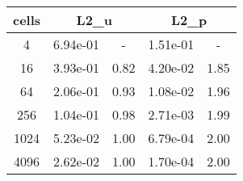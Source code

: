\documentclass[10pt]{report}
\begin{document}
\begin{table}[H]
\begin{center}
\begin{tabular}{|c|c|c|c|c|} \hline
cells & 
\multicolumn{2}{|c|}{L2_u} & 
\multicolumn{2}{|c|}{L2_p}\\ \hline
4 & 6.94e-01 & - & 1.51e-01 & -\\ \hline
16 & 3.93e-01 & 0.82 & 4.20e-02 & 1.85\\ \hline
64 & 2.06e-01 & 0.93 & 1.08e-02 & 1.96\\ \hline
256 & 1.04e-01 & 0.98 & 2.71e-03 & 1.99\\ \hline
1024 & 5.23e-02 & 1.00 & 6.79e-04 & 2.00\\ \hline
4096 & 2.62e-02 & 1.00 & 1.70e-04 & 2.00\\ \hline
\end{tabular}
\end{center}
\end{table}
\end{document}
